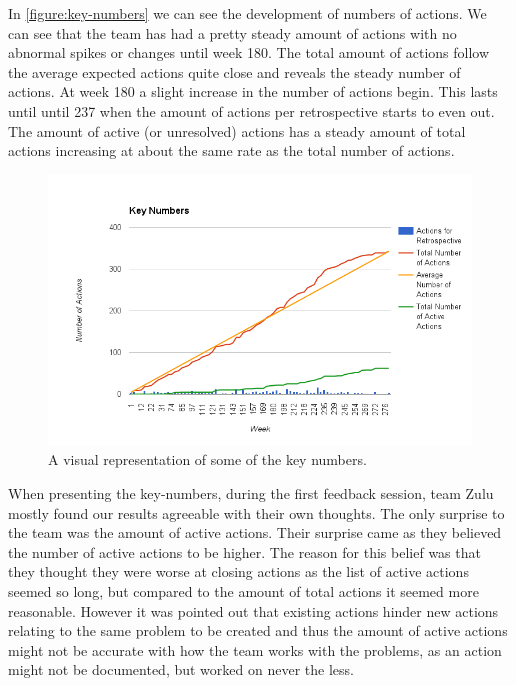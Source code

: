 In \autoref{figure:key-numbers} we can see the development of numbers of actions. We can see that the team has had a pretty steady amount of actions with no abnormal spikes or changes until week 180. The total amount of actions follow the average expected actions quite close and reveals the steady number of actions.
At week 180 a slight increase in the number of actions begin. This lasts until until 237 when the amount of actions per retrospective starts to even out. 
The amount of active (or unresolved) actions has a steady amount of total actions increasing at about the same rate as the total number of actions. 

\begin{figure}[!h]
	\centering
	\includegraphics[width=\textwidth, keepaspectratio]{figures/key-numbers.png}
	\caption{A visual representation of some of the key numbers.}
	\label{figure:key-numbers}
\end{figure}
\afterpage{\clearpage}

When presenting the key-numbers, during the first feedback session, team Zulu mostly found our results agreeable with their own thoughts. The only surprise to the team was the amount of active actions. Their surprise came as they believed the number of active actions to be higher. The reason for this belief was that they thought they were worse at closing actions as the list of active actions seemed so long, but compared to the amount of total actions it seemed more reasonable. However it was pointed out that existing actions hinder new actions relating to the same problem to be created and thus the amount of active actions might not be accurate with how the team works with the problems, as an action might not be documented, but worked on never the less. 

